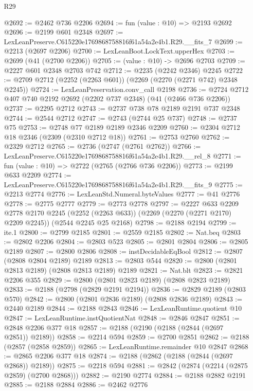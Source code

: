 \begin{lexlean}{R29}
\begin{coremodule}
@2692 := @2462 @736 @2206
@2694 := fun (value : @10) => @2193 @2692
@2696 := @2199 @601 @2348
@2697 := LexLeanPreserve.C615220e1769868758816f61a54a2e4b1.R29.__fits_7
@2699 := @2213 (@2697 @2206)
@2700 := LexLeanBoot.LockText.upperHex
@2703 := @2699 (@41 (@2700 @2206))
@2705 := (value : @10) -> @2696 @2703
@2709 := @2227 @601 @2348 @2703 @742
@2712 := @2235 (@2242 @2346) @2245
@2722 := @2709 @2712 (@2252 (@2263 @601)) (@2269 (@2270 (@2271 @742) @2348 @2245))
@2724 := LexLeanPreservation.conv_call @2198
@2736 := @2724 @2712 @407 @740 @2192 @2692 (@2202 @737 @2348) (@41 (@2466 @736 @2206))
@2737 := @2295 @2712
@2743 := @2737 @738 @78 @2189 @2191 @737 @2348
@2744 := @2544 @2712
@2747 := @2743 (@2744 @25 @737)
@2748 := @2737 @75
@2753 := @2748 @77 @2189 @2189 @2346 @2209
@2760 := @2304 @2712 @18 @2346 (@2309 (@2310 @2712 @18))
@2761 := @2753 @2760
@2762 := @2329 @2712
@2765 := @2736 (@2747 (@2761 @2762))
@2766 := LexLeanPreserve.C615220e1769868758816f61a54a2e4b1.R29.__rel_8
@2771 := fun (value : @10) => @2722 (@2765 (@2766 @736 @2206))
@2773 := @2199 @633 @2209
@2774 := LexLeanPreserve.C615220e1769868758816f61a54a2e4b1.R29.__fits_9
@2775 := @2213 @2774
@2776 := LexLeanStd.Numeral.byteValues
@2777 := @41 @2776
@2778 := @2775 @2777
@2779 := @2773 @2778
@2797 := @2227
    @633
    @2209
    @2778
    @2170
    @2245
    (@2252 (@2263 @633))
    (@2269 (@2270 (@2271 @2170) @2209 @2245))
    (@2544 @2245 @25 @2168)
@2798 := @2188 @2194
@2799 := ite.{1}
@2800 := @2799 @2185
@2801 := @2559 @2185
@2802 := Nat.beq
@2803 := @2802 @2206
@2804 := @2803 @523
@2805 := @2801 @2804
@2806 := @2805 @2189
@2807 := @2800 @2806
@2808 := instDecidableEqBool
@2812 := @2807 (@2808 @2804 @2189) @2189
@2813 := @2803 @544
@2820 := @2800 (@2801 @2813 @2189) (@2808 @2813 @2189) @2189
@2821 := Nat.blt
@2823 := @2821 @2206 @355
@2829 := @2800 (@2801 @2823 @2189) (@2808 @2823 @2189)
@2833 := @2188 (@2798 (@2829 @2191 @2194))
@2836 := @2829 @2189 (@2803 @570)
@2842 := @2800 (@2801 @2836 @2189) (@2808 @2836 @2189)
@2843 := @2440 @2189
@2844 := @2188 @2843
@2846 := LexLeanRuntime.quotient @10
@2847 := LexLeanRuntime.instQuotientNat
@2848 := @2846 @2847
@2851 := @2848 @2206 @377 @18
@2857 := @2188 (@2190 (@2188 (@2844 (@2697 @2851)) @2189))
@2858 := @2214 @594
@2859 := @2700 @2851
@2862 := @2188 (@2857 (@2858 @2859))
@2865 := LexLeanRuntime.remainder @10 @2847
@2868 := @2865 @2206 @377 @18
@2874 := @2188 (@2862 (@2188 (@2844 (@2697 @2868)) @2189))
@2875 := @2218 @594
@2881 := @2842 (@2874 (@2214 (@2875 @2859) (@2700 @2868)))
@2882 := @2190 @2774
@2884 := @2188 @2882 @2191
@2885 := @2188 @2884
@2886 := @2462 @2776

\end{coremodule}
\end{lexlean}
